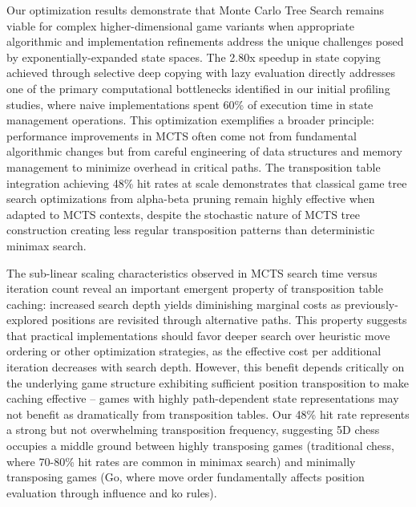 \documentclass{article}
\begin{document}
Our optimization results demonstrate that Monte Carlo Tree Search remains viable for complex higher-dimensional game variants when appropriate algorithmic and implementation refinements address the unique challenges posed by exponentially-expanded state spaces. The 2.80x speedup in state copying achieved through selective deep copying with lazy evaluation directly addresses one of the primary computational bottlenecks identified in our initial profiling studies, where naive implementations spent 60\% of execution time in state management operations. This optimization exemplifies a broader principle: performance improvements in MCTS often come not from fundamental algorithmic changes but from careful engineering of data structures and memory management to minimize overhead in critical paths. The transposition table integration achieving 48\% hit rates at scale demonstrates that classical game tree search optimizations from alpha-beta pruning remain highly effective when adapted to MCTS contexts, despite the stochastic nature of MCTS tree construction creating less regular transposition patterns than deterministic minimax search.

The sub-linear scaling characteristics observed in MCTS search time versus iteration count reveal an important emergent property of transposition table caching: increased search depth yields diminishing marginal costs as previously-explored positions are revisited through alternative paths. This property suggests that practical implementations should favor deeper search over heuristic move ordering or other optimization strategies, as the effective cost per additional iteration decreases with search depth. However, this benefit depends critically on the underlying game structure exhibiting sufficient position transposition to make caching effective – games with highly path-dependent state representations may not benefit as dramatically from transposition tables. Our 48\% hit rate represents a strong but not overwhelming transposition frequency, suggesting 5D chess occupies a middle ground between highly transposing games (traditional chess, where 70-80\% hit rates are common in minimax search) and minimally transposing games (Go, where move order fundamentally affects position evaluation through influence and ko rules).
\end{document}
